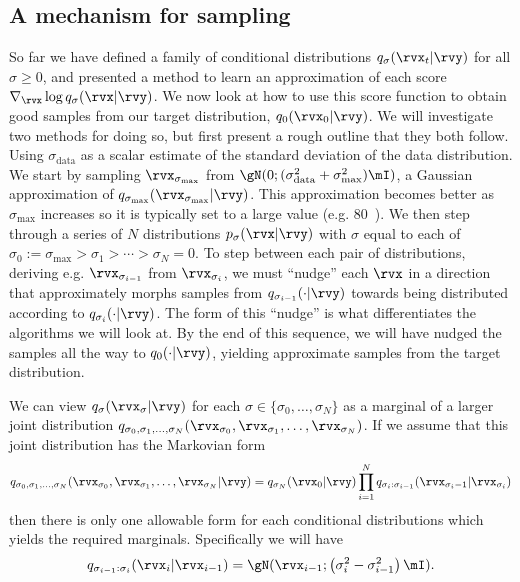 \subsection{A mechanism for sampling}
So far we have defined a family of conditional distributions $q_\sigma(\rvx_t|\rvy)$ for all $\sigma \geq 0$, and presented a method to learn an approximation of each score $\nabla_\rvx \log q_\sigma(\rvx|\rvy)$. We now look at how to use this score function to obtain good samples from our target distribution, $q_0(\rvx_0|\rvy)$. We will investigate two methods for doing so, but first present a rough outline that they both follow. Using $\sigma_\text{data}$ as a scalar estimate of the standard deviation of the data distribution. We start by sampling $\rvx_{\sigma_\text{max}}$ from $\gN(0; (\sigma_\text{data}^2+\sigma_\text{max}^2)\mI)$, a Gaussian approximation of $q_{\sigma_\text{max}}(\rvx_{\sigma_\text{max}} | \rvy)$. This approximation becomes better as $\sigma_\text{max}$ increases so it is typically set to a large value (e.g. 80~\cite{karras2022elucidating}). We then step through a series of $N$ distributions $p_\sigma(\rvx|\rvy)$ with $\sigma$ equal to each of $\sigma_0 := \sigma_\text{max} > \sigma_1 > \cdots > \sigma_N = 0$. To step between each pair of distributions, deriving e.g. $\rvx_{\sigma_{i-1}}$ from $\rvx_{\sigma_{i}}$, we must ``nudge'' each $\rvx$ in a direction that approximately morphs samples from $q_{\sigma_{i-1}}(\cdot|\rvy)$ towards being distributed according to $q_{\sigma_{i}}(\cdot|\rvy)$. The form of this ``nudge'' is what differentiates the algorithms we will look at. By the end of this sequence, we will have nudged the samples all the way to $q_0(\cdot|\rvy)$, yielding approximate samples from the target distribution.


We can view $q_\sigma( \rvx_\sigma | \rvy)$ for each $\sigma \in \{\sigma_0,\ldots, \sigma_N\}$ as a marginal of a larger joint distribution $q_{\sigma_0,\sigma_1,\ldots,\sigma_N}(\rvx_{\sigma_0},\rvx_{\sigma_1},\ldots,\rvx_{\sigma_N})$. If we assume that this joint distribution has the Markovian form
\begin{equation} \label{eq:ddpm-joint-q}
    q_{\sigma_0,\sigma_1,\ldots,\sigma_N}(\rvx_{\sigma_0},\rvx_{\sigma_1},\ldots,\rvx_{\sigma_N}|\rvy) = q_{\sigma_N}(\rvx_0|\rvy) \prod_{i=1}^N q_{\sigma_{i}:\sigma_{i-1}}(\rvx_{\sigma_i-1}|\rvx_{\sigma_{i}})
\end{equation}
then there is only one allowable form for each conditional distributions which yields the required marginals. Specifically we will have
\begin{equation}
    q_{\sigma_{i-1}:\sigma_i}(\rvx_i|\rvx_{i-1}) = \gN( \rvx_{i-1} ; \left(\sigma_i^2 - \sigma_{i-1}^2 \right) \mI ).
\end{equation}

